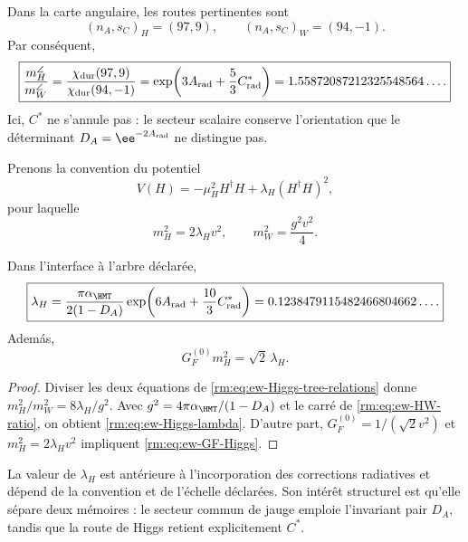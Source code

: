 Dans la carte angulaire, les routes pertinentes sont
\begin{equation}
\label{rm:eq:ew-HW-signatures}
(n_A,s_C)_H=(97,9),
\qquad
(n_A,s_C)_W=(94,-1).
\end{equation}
Par conséquent,
\begin{equation}
\label{rm:eq:ew-HW-ratio}
\boxed{
\frac{m_H^{\angle}}{m_W^{\angle}}
=\frac{\chi_{\rm dur}(97,9)}{\chi_{\rm dur}(94,-1)}
=\exp\!\left(3A_{\rm rad}+\frac53C^*_{\rm rad}\right)
=1.55872087212325548564\ldots .}
\end{equation}
Ici, \(C^*\) ne s'annule pas : le secteur scalaire conserve l'orientation
que le déterminant \(D_A=\ee^{-2A_{\rm rad}}\) ne distingue pas.

Prenons la convention du potentiel
\begin{equation}
\label{rm:eq:ew-Higgs-potential}
V(H)=-\mu_H^2H^\dagger H
+\lambda_H(H^\dagger H)^2,
\end{equation}
pour laquelle
\begin{equation}
\label{rm:eq:ew-Higgs-tree-relations}
m_H^2=2\lambda_Hv^2,
\qquad
m_W^2=\frac{g^2v^2}{4}.
\end{equation}

\begin{corollary}
\label{rm:cor:ew-Higgs-lambda}
Dans l'interface à l'arbre déclarée,
\begin{equation}
\label{rm:eq:ew-Higgs-lambda}
\boxed{
\lambda_H
=\frac{\pi\alpha_{\HMT}}{2(1-D_A)}
\exp\!\left(6A_{\rm rad}+\frac{10}{3}C^*_{\rm rad}\right)
=0.1238479115482466804662\ldots .}
\end{equation}
Adem\'as,
\begin{equation}
\label{rm:eq:ew-GF-Higgs}
G_F^{(0)}m_H^2=\sqrt2\,\lambda_H.
\end{equation}
\end{corollary}

\begin{proof}
Diviser les deux équations de
\cref{rm:eq:ew-Higgs-tree-relations} donne
\(m_H^2/m_W^2=8\lambda_H/g^2\). Avec
\(g^2=4\pi\alpha_{\HMT}/(1-D_A)\) et le carré de
\cref{rm:eq:ew-HW-ratio}, on obtient \cref{rm:eq:ew-Higgs-lambda}. D'autre part,
\(G_F^{(0)}=1/(\sqrt2v^2)\) et
\(m_H^2=2\lambda_Hv^2\) impliquent
\cref{rm:eq:ew-GF-Higgs}.
\end{proof}

La valeur de \(\lambda_H\) est antérieure à l'incorporation des corrections
radiatives et dépend de
la convention et de l'échelle déclarées. Son intérêt structurel est qu'elle
sépare deux mémoires : le secteur commun de jauge emploie l'invariant pair \(D_A\),
tandis que la route de Higgs retient explicitement \(C^*\).

